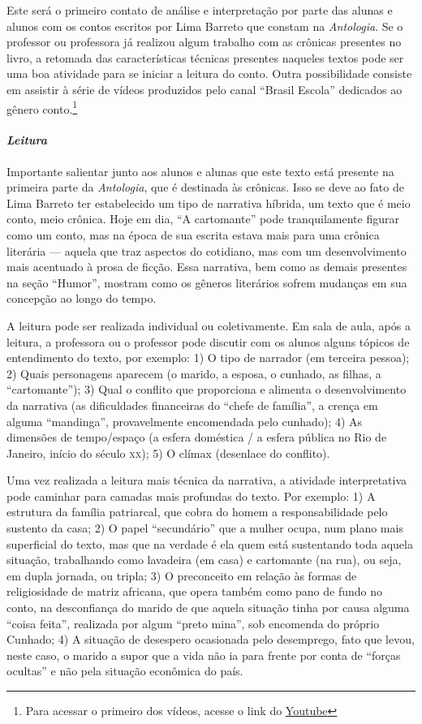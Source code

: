 \documentclass[11pt]{extarticle}
\begin{document}
Este será o primeiro contato de análise e interpretação por parte das
alunas e alunos com os contos escritos por Lima Barreto que constam na
\emph{Antologia}. Se o professor ou professora já realizou algum
trabalho com as crônicas presentes no livro, a retomada das
características técnicas presentes naqueles textos pode ser uma boa
atividade para se iniciar a leitura do conto. Outra possibilidade
consiste em assistir à série de vídeos produzidos pelo canal ``Brasil
Escola'' dedicados ao gênero conto.\footnote{Para acessar o primeiro dos
  vídeos, acesse o link do
  \href{https://www.youtube.com/watch?v=c-rge5nGRyk}{Youtube}}

\paragraph{\textit{Leitura}}

Importante salientar junto aos alunos e alunas que este texto está
presente na primeira parte da \emph{Antologia}, que é destinada às
crônicas. Isso se deve ao fato de Lima Barreto ter estabelecido um tipo
de narrativa híbrida, um texto que é meio conto, meio crônica. Hoje em
dia, ``A cartomante'' pode tranquilamente figurar como um
conto, mas na época de sua escrita estava mais para uma crônica
literária --- aquela que traz aspectos do cotidiano, mas com um
desenvolvimento mais acentuado à prosa de ficção. Essa narrativa, bem
como as demais presentes na seção ``Humor'', mostram como os gêneros
literários sofrem mudanças em sua concepção ao longo do tempo.

A leitura pode ser realizada individual ou coletivamente. Em sala de
aula, após a leitura, a professora ou o professor pode discutir com os
alunos alguns tópicos de entendimento do texto, por exemplo: 1) O tipo de
narrador (em terceira pessoa); 2) Quais personagens aparecem (o marido,
a esposa, o cunhado, as filhas, a ``cartomante''); 3) Qual o conflito
que proporciona e alimenta o desenvolvimento da narrativa (as
dificuldades financeiras do ``chefe de família'', a crença em alguma
``mandinga'', provavelmente encomendada pelo cunhado); 4) As dimensões
de tempo/espaço (a esfera doméstica / a esfera pública no Rio de
Janeiro, início do século \textsc{xx}); 5) O clímax (desenlace do conflito).

Uma vez realizada a leitura mais técnica da narrativa, a atividade
interpretativa pode caminhar para camadas mais profundas do texto. Por
exemplo: 1) A estrutura da família patriarcal, que cobra do homem a
responsabilidade pelo sustento da casa; 2) O papel ``secundário'' que a
mulher ocupa, num plano mais superficial do texto, mas que na verdade é
ela quem está sustentando toda aquela situação, trabalhando como
lavadeira (em casa) e cartomante (na rua), ou seja, em dupla jornada, ou
tripla; 3) O preconceito em relação às formas de religiosidade de matriz
africana, que opera também como pano de fundo no conto, na desconfiança
do marido de que aquela situação tinha por causa alguma ``coisa feita'',
realizada por algum ``preto mina'', sob encomenda do próprio Cunhado; 4)
A situação de desespero ocasionada pelo desemprego, fato que levou,
neste caso, o marido a supor que a vida não ia para frente por conta de
``forças ocultas'' e não pela situação econômica do país.
\end{document}

